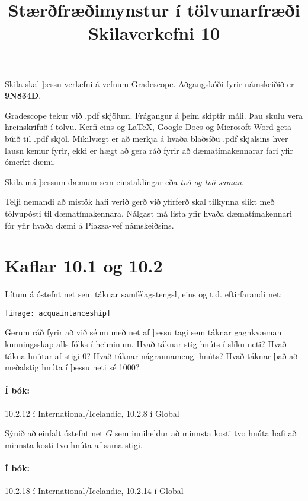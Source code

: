 \documentclass{article}
\title{Stærðfræðimynstur í tölvunarfræði \\ Skilaverkefni 10}
\author{}
\begin{document}
\maketitle

Skila skal þessu verkefni á vefnum \href{https://gradescope.com/courses/9487}{Gradescope}. Aðgangskóði fyrir námskeiðið er \textbf{9N834D}. 

Gradescope tekur við .pdf skjölum. Frágangur á þeim skiptir máli. Þau skulu vera hreinskrifuð í tölvu. Kerfi eins og \LaTeX, Google Docs og Microsoft Word geta búið til .pdf skjöl. Mikilvægt er að merkja á hvaða blaðsíðu .pdf skjalsins hver lausn kemur fyrir, ekki er hægt að gera ráð fyrir að dæmatímakennarar fari yfir ómerkt dæmi.

Skila má þessum dæmum sem einstaklingar eða \emph{tvö og tvö saman}.

Telji nemandi að mistök hafi verið gerð við yfirferð skal tilkynna slíkt með tölvupósti til dæmatímakennara. Nálgast má lista yfir hvaða dæmatímakennari fór yfir hvaða dæmi á Piazza-vef námskeiðsins.
\section{Kaflar 10.1 og 10.2}

\question Lítum á óstefnt net sem táknar samfélagstengsl, eins og t.d. eftirfarandi net:

\begin{center}
\texttt{[image: acquaintanceship]}
\end{center}

Gerum ráð fyrir að við séum með net af þessu tagi sem táknar gagnkvæman kunningsskap alls fólks í heiminum. Hvað táknar stig hnúts í slíku neti? Hvað tákna hnútar af stigi 0? Hvað táknar nágrannamengi hnúts? Hvað táknar það að meðalstig hnúta í þessu neti sé 1000?

\paragraph{Í bók:} 10.2.12 í International/Icelandic, 10.2.8 í Global

\newpage

\question Sýnið að einfalt óstefnt net $G$ sem inniheldur að minnsta kosti tvo hnúta hafi að minnsta kosti tvo hnúta af sama stigi.

\paragraph{Í bók:} 10.2.18 í International/Icelandic, 10.2.14 í Global
\end{document}
